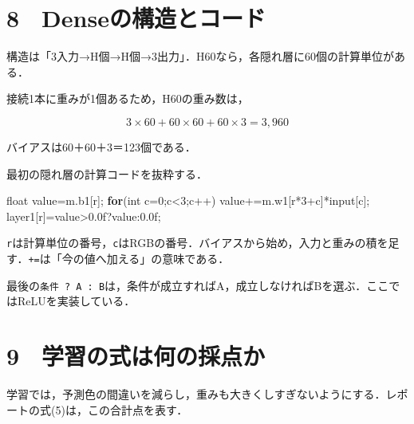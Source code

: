 \documentclass[
  14pt,
  a5paper,
]{extarticle}
\newenvironment{Shaded}{}{}
\newcommand{\BuiltInTok}[1]{\textcolor[rgb]{0.00,0.50,0.00}{#1}}
\newcommand{\ControlFlowTok}[1]{\textcolor[rgb]{0.00,0.44,0.13}{\textbf{#1}}}
\newcommand{\DataTypeTok}[1]{\textcolor[rgb]{0.56,0.13,0.00}{#1}}
\newcommand{\DecValTok}[1]{\textcolor[rgb]{0.25,0.63,0.44}{#1}}
\newcommand{\FloatTok}[1]{\textcolor[rgb]{0.25,0.63,0.44}{#1}}
\newcommand{\NormalTok}[1]{#1}
\newcommand{\OperatorTok}[1]{\textcolor[rgb]{0.40,0.40,0.40}{#1}}
\begin{document}
\newpage

\section{8　Denseの構造とコード}\label{denseux306eux69cbux9020ux3068ux30b3ux30fcux30c9}

構造は「3入力→H個→H個→3出力」．H60なら，各隠れ層に60個の計算単位がある．

接続1本に重みが1個あるため，H60の重み数は，

\[3\times60+60\times60+60\times3=3,960\]

バイアスは60＋60＋3＝123個である．

最初の隠れ層の計算コードを抜粋する．

\begin{Shaded}
\begin{Highlighting}[]
\DataTypeTok{float}\NormalTok{ value}\OperatorTok{=}\NormalTok{m}\OperatorTok{.}\NormalTok{b1}\OperatorTok{[}\NormalTok{r}\OperatorTok{];}
\ControlFlowTok{for}\OperatorTok{(}\DataTypeTok{int}\NormalTok{ c}\OperatorTok{=}\DecValTok{0}\OperatorTok{;}\NormalTok{c}\OperatorTok{\textless{}}\DecValTok{3}\OperatorTok{;}\NormalTok{c}\OperatorTok{++)}\NormalTok{ value}\OperatorTok{+=}\NormalTok{m}\OperatorTok{.}\NormalTok{w1}\OperatorTok{[}\NormalTok{r}\OperatorTok{*}\DecValTok{3}\OperatorTok{+}\NormalTok{c}\OperatorTok{]*}\NormalTok{input}\OperatorTok{[}\NormalTok{c}\OperatorTok{];}
\NormalTok{layer1}\OperatorTok{[}\NormalTok{r}\OperatorTok{]=}\NormalTok{value}\OperatorTok{\textgreater{}}\FloatTok{0.0}\BuiltInTok{f}\OperatorTok{?}\NormalTok{value}\OperatorTok{:}\FloatTok{0.0}\BuiltInTok{f}\OperatorTok{;}
\end{Highlighting}
\end{Shaded}

\texttt{r}は計算単位の番号，\texttt{c}はRGBの番号．バイアスから始め，入力と重みの積を足す．\texttt{+=}は「今の値へ加える」の意味である．

最後の\texttt{条件\ ?\ A\ :\ B}は，条件が成立すればA，成立しなければBを選ぶ．ここではReLUを実装している．

\newpage

\section{9　学習の式は何の採点か}\label{ux5b66ux7fd2ux306eux5f0fux306fux4f55ux306eux63a1ux70b9ux304b}

学習では，予測色の間違いを減らし，重みも大きくしすぎないようにする．レポートの式(5)は，この合計点を表す．
\end{document}
